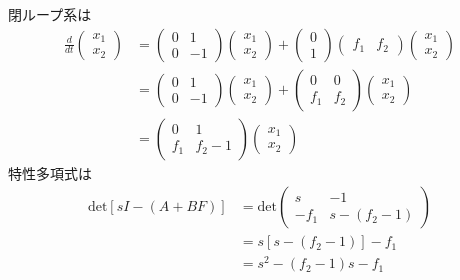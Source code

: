 \documentclass[a4paper,11pt]{jreport}
\begin{document}
閉ループ系は
\begin{align*}
	\frac{d}{dt}
	\left (
	\begin{array}{c}
	 x_1 \\ x_2 
	\end{array}
	\right )
	& = 
	\left (
	\begin{array}{cc}
	 0 & 1 \\
	 0 & -1
	\end{array}
	\right )
	\left (
	\begin{array}{c}
	 x_1 \\ x_2 
	\end{array}
	\right )
	+
	\left (
	\begin{array}{c}
	 0 \\ 1 
	\end{array}
	\right )
	\left (
	\begin{array}{cc}
	 f_1 & f_2
	\end{array}
	\right )
	\left (
	\begin{array}{c}
	 x_1 \\ x_2 
	\end{array}
	\right )
\\
	&=
	\left (
	\begin{array}{cc}
	 0 & 1 \\
	 0 & -1
	\end{array}
	\right )
	\left (
	\begin{array}{c}
	 x_1 \\ x_2 
	\end{array}
	\right )
	+
	\left (
	\begin{array}{cc}
	 0   & 0   \\
	 f_1 & f_2
	\end{array}
	\right )
	\left (
	\begin{array}{c}
	 x_1 \\ x_2 
	\end{array}
	\right )
\\
	&=
	\left (
	\begin{array}{cc}
	 0 & 1 \\
	 f_1 & f_2-1
	\end{array}
	\right )
	\left (
	\begin{array}{c}
	 x_1 \\ x_2 
	\end{array}
	\right )
\end{align*}
特性多項式は
\begin{align*}
	\mbox{det}[sI-(A+BF)]
	& =
	\mbox{det}
	\left (
	\begin{array}{cc}
	 s & - 1 \\
	 - f_1 & s- (f_2-1)
	\end{array}
	\right )
\\
	&= s [s-(f_2-1)] - f_1
\\
	&= s^2 - (f_2-1) s - f_1
\end{align*}
\end{document}

